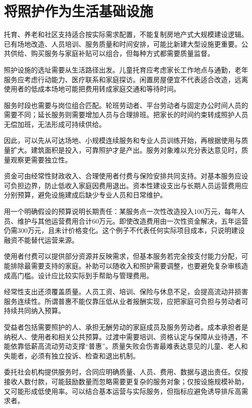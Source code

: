 \documentclass[UTF8,fontset=fandol,zihao=-4,oneside,openany]{ctexbook}
\begin{document}
\section{将照护作为生活基础设施}
托育、养老和社区支持适合按实际需求配置，不能复制房地产式大规模建设逻辑。已有场地改造、人员培训、服务质量和时间安排，可能比新建大型设施更重要。公共供给、购买服务与家庭补贴可以组合，但每种方式都需要质量监督。

\label{arg:P254}
照护设施的选址需要从生活路径出发。儿童托育应考虑家长工作地点与通勤，老年服务应考虑行动能力、医疗联系和家庭探访。闲置房屋便宜不代表适合改造，远离使用者的低成本场地可能把费用转成家庭交通和等待时间。

服务时段也需要与岗位组合匹配。轮班劳动者、平台劳动者与固定办公时间人员的需要不同；延长服务则需要增加人员与合理排班。把家长的时间约束转成照护人员无偿加班，无法形成可持续供给。

因此，可以先从可达场地、小规模连续服务和专业人员训练开始，再根据使用与质量扩大。建筑面积是投入，可靠照护才是产出。服务对象难以充分表达意见时，质量观察更需要独立性。

资金可由经常性财政收入、合理使用者付费与保险安排共同支持。对基本服务应设可负担边界，防止低收入家庭因费用退出。资本性建设支出与长期人员运营费用应分别预算，避免设施建成后缺少专业人员和日常维护。

\label{arg:P255}
用一个明确假设的预算说明长期责任：某服务点一次性改造投入100万元，每年人员、维护与其他运营费用合计60万元。即使改造费用由一次性资金解决，五年运营仍需300万元，且未计价格变化。这个例子不代表任何实际项目成本，只说明建设融资不能替代运营来源。

使用者付费可以提供部分资源并反映需求，但基本服务若完全按支付能力分配，可能排除最需要支持的家庭。补助可以随收入和照护需要调整，也要避免复杂审核造成高门槛。设计应比较实际到手帮助与管理费用。

经常性支出还须覆盖质量。人员工资、培训、保险与休息不足，会提高流动并损害服务连续性。所谓普惠不能仅靠压低从业者报酬实现，应把家庭可负担与劳动者可持续共同纳入预算。

受益者包括需要照护的人、承担无酬劳动的家庭成员及服务劳动者。成本承担者是纳税人、使用者和相关公共预算。过渡中需要培训、资格认定与保障从业待遇，不能依靠低薪高流动劳动支撑“普惠”。质量失败会伤害最难表达意见的儿童、老人和失能者，必须有独立投诉、检查和退出机制。

\label{arg:P256}
委托社会机构提供服务时，合同应明确质量、人员、费用、数据与退出责任。仅按接收人数付款，可能鼓励数量而忽略需要更复杂的服务对象；仅按设施规模补助，又可能形成低使用率。可以结合基本运营与实际服务，但指标应避免诱导排斥高需求者。
\end{document}
